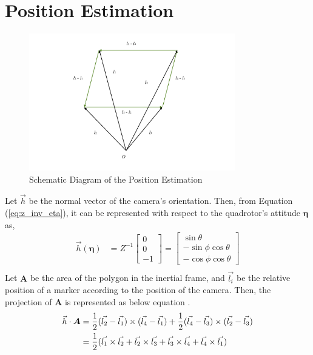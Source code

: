 \section{Position Estimation}
\begin{figure}
    \centering
    \includegraphics[width=0.8\textwidth]{graphics/scheme.pdf}
    \caption{Schematic Diagram of the Position Estimation}
    \label{fig:scheme}
\end{figure}
Let  \(\vec{ h} \) be the normal vector of the camera's orientation. Then, from Equation (\ref{eq:z_inv_eta}),  it can be represented with respect to the quadrotor's attitude \( {\boldsymbol \eta} \) as,
\begin{equation}
\begin{aligned}
{\vec h} ( {\boldsymbol \eta} ) & =  Z^{-1} 
\begin{bmatrix}
0 \\
0 \\
-1
\end{bmatrix}
 = 
\begin{bmatrix}
\sin{\theta} \\
- \sin{\phi} \cos{\theta} \\
- \cos{\phi} \cos{\theta}
\end{bmatrix}\\
\end{aligned}
\end{equation}
Let \( \boldsymbol A \) be the area of the polygon in the inertial frame, and \(\vec{l_i} \) be the relative position of a marker according to the position of the camera. Then, the projection of  \(\boldsymbol A \) is represented as below equation \cite{Haralick94}. \\
\begin{equation}
\label{eq:projection}
\begin{aligned}
{\vec h} \cdot { \boldsymbol A} & = {1 \over 2}(\vec{l_2} - \vec{l_1}) \times (\vec{l_4} - \vec{l_1}) + {1 \over 2}(\vec{l_4} - \vec{l_3}) \times (\vec{l_2} - \vec{l_3}) \\
& = {1 \over 2}(\vec{l_1} \times \vec{l_2} + \vec{l_2} \times \vec{l_3}  + \vec{l_3} \times \vec{l_4} + \vec{l_4} \times  \vec{l_1}) 
\end{aligned}
\end{equation}
